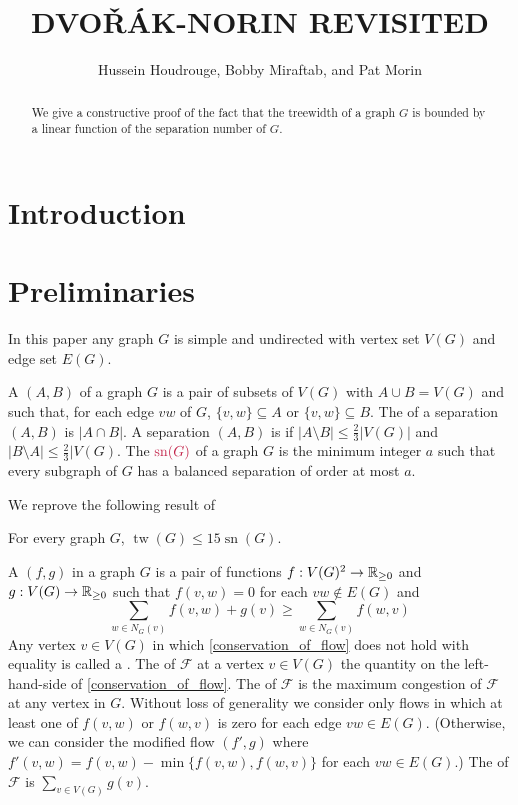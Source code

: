\documentclass{patmorin}
\title{\MakeUppercase{Dvo\v{r}ák-Norin Revisited}}
\author{Hussein Houdrouge, Bobby Miraftab, and Pat Morin}
\date{}
\DeclareMathOperator{\sep}{sn}
\DeclareMathOperator{\tw}{tw}
\begin{document}
\maketitle

\begin{abstract}
  We give a constructive proof of the fact that the treewidth of a graph $G$ is bounded by a linear function of the separation number of $G$.
\end{abstract}


\section{Introduction}

\section{Preliminaries}

In this paper any graph $G$ is simple and undirected with vertex set $V(G)$ and edge set $E(G)$.

A  $(A,B)$ of a graph $G$ is a pair of subsets of $V(G)$ with $A\cup B= V(G)$ and such that, for each edge $vw$ of $G$, $\{v,w\}\subseteq A$ or $\{v,w\}\subseteq B$.  The  of a separation $(A,B)$ is $|A\cap B|$.  A separation $(A,B)$ is  if $|A\setminus B|\le \tfrac{2}{3}|V(G)|$ and $|B\setminus A|\le \tfrac{2}{3}|V(G)$.  The  $\mathdefin{\sep(G)}$ of a graph $G$ is the minimum integer $a$ such that every subgraph of $G$ has a balanced separation of order at most $a$.

We reprove the following result of \citet{dvorak.norin:treewidth}
\begin{thm}
  For every graph $G$, $\tw(G)\le 15\sep(G)$.
\end{thm}

A  $(f,g)$ in a graph $G$ is a pair of functions $f:V(G)^2\to\mathbb{R}_{\ge 0}$ and $g:V(G)\to\mathbb{R}_{\ge 0}$ such that $f(v,w)=0$ for each $vw\not\in E(G)$ and
\begin{equation}
  \sum_{w\in N_G(v)} f(v,w) + g(v) \ge \sum_{w\in N_G(v)} f(w,v)
  \label{conservation_of_flow}
\end{equation}
Any vertex $v\in V(G)$ in which \cref{conservation_of_flow} does not hold with equality is called a .  The  of $\mathcal{F}$ at a vertex $v\in V(G)$ the quantity on the left-hand-side of \cref{conservation_of_flow}.  The  of $\mathcal{F}$ is the maximum congestion of $\mathcal{F}$ at any vertex in $G$.  Without loss of generality we consider only flows in which at least one of $f(v,w)$ or $f(w,v)$ is zero for each edge $vw\in E(G)$.  (Otherwise, we can consider the modified flow $(f',g)$ where $f'(v,w)=f(v,w)-\min\{f(v,w),f(w,v)\}$ for each $vw\in E(G)$.)  The  of $\mathcal{F}$ is $\sum_{v\in V(G)} g(v)$.
\end{document}
